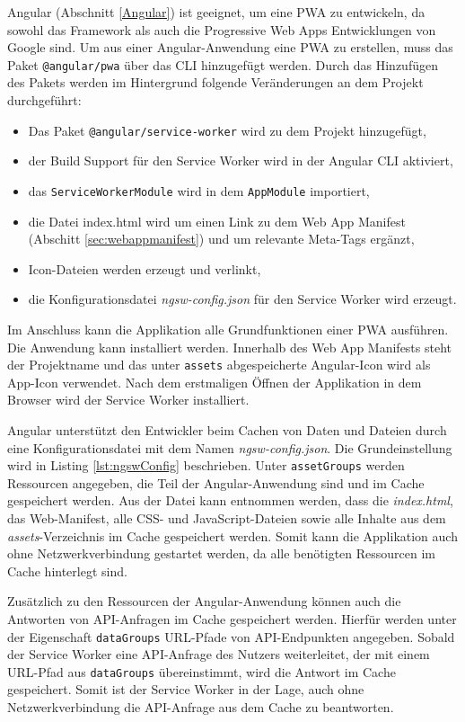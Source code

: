 Angular (Abschnitt \ref{Angular}) ist geeignet, um eine PWA zu entwickeln, da sowohl das Framework als auch die Progressive Web Apps Entwicklungen von Google sind. 
Um aus einer Angular-Anwendung eine PWA zu erstellen, muss das Paket \texttt{@angular/pwa} über das \ac{CLI} hinzugefügt werden.
Durch das Hinzufügen des Pakets werden im Hintergrund folgende Veränderungen an dem Projekt durchgeführt: 
\begin{itemize}
    \item Das Paket \texttt{@angular/service-worker} wird zu dem Projekt hinzugefügt,
    \item der Build Support für den Service Worker wird in der Angular CLI aktiviert,
    \item das \texttt{ServiceWorkerModule} wird in dem \texttt{AppModule} importiert,
    \item die Datei index.html wird um einen Link zu dem Web App Manifest (Abschitt \ref{sec:webappmanifest}) und um relevante Meta-Tags ergänzt,
    \item Icon-Dateien werden erzeugt und verlinkt,
    \item die Konfigurationsdatei \textit{ngsw-config.json} für den Service Worker wird erzeugt. 
\end{itemize}

Im Anschluss kann die Applikation alle Grundfunktionen einer PWA ausführen. Die Anwendung kann installiert werden. Innerhalb des Web App Manifests steht der Projektname und das unter \texttt{assets} abgespeicherte Angular-Icon wird als App-Icon verwendet. Nach dem erstmaligen Öffnen der Applikation in dem Browser wird der Service Worker installiert. 

Angular unterstützt den Entwickler beim Cachen von Daten und Dateien durch eine Konfigurationsdatei mit dem Namen \textit{ngsw-config.json}. Die Grundeinstellung wird in Listing \ref{lst:ngswConfig} beschrieben. Unter \texttt{assetGroups} werden Ressourcen angegeben, die Teil der Angular-Anwendung sind und im Cache gespeichert werden. Aus der Datei kann entnommen werden, dass die \textit{index.html}, das Web-Manifest, alle CSS- und JavaScript-Dateien sowie alle Inhalte aus dem \textit{assets}-Verzeichnis im Cache gespeichert werden. 
Somit kann die Applikation auch ohne Netzwerkverbindung gestartet werden, da alle benötigten Ressourcen im Cache hinterlegt sind. 

Zusätzlich zu den Ressourcen der Angular-Anwendung können auch die Antworten von API-Anfragen im Cache gespeichert werden.
Hierfür werden unter der Eigenschaft \texttt{dataGroups} URL-Pfade von API-Endpunkten angegeben. Sobald der Service Worker eine API-Anfrage des Nutzers weiterleitet, der mit einem URL-Pfad aus \texttt{dataGroups} übereinstimmt, wird die Antwort im Cache gespeichert. 
Somit ist der Service Worker in der Lage, auch ohne Netzwerkverbindung die API-Anfrage aus dem Cache zu beantworten. 

